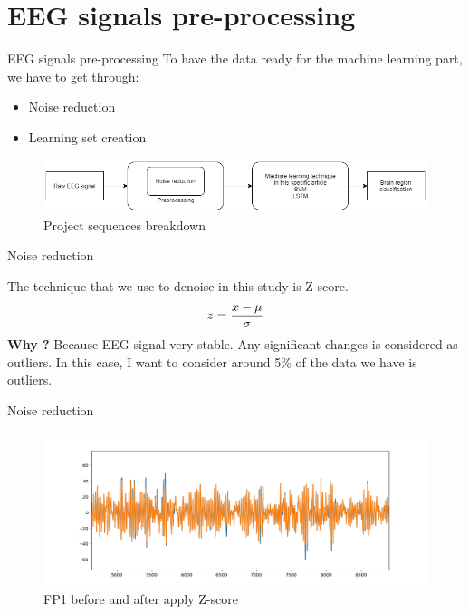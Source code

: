 \documentclass[xcolor=dvipsnames]{beamer} %
\begin{document}
	\section{EEG signals pre-processing}
	
	\begin{frame}{EEG signals pre-processing}
		To have the data ready for the machine learning part, we have to get through:
		\begin{itemize}
		    \item Noise reduction
		    \item Learning set creation
		\end{itemize}
		
		\begin{figure}
	        \centering
	        \includegraphics[scale = 0.4]{images/GeneralDiagram.png}
	        \caption{Project sequences breakdown}
	        \label{fig:breakdown}
	    \end{figure}
	\end{frame}
	
	
	\begin{frame}{Noise reduction}
	
	The technique that we use to denoise in this study is Z-score.
		$$z={{x-\mu}  \over \sigma }$$
	\pause	
	\textbf{Why ?}
	\pause
	Because EEG signal very stable. Any significant changes is considered as outliers. In this case, I want to consider around 5\% of the data we have is outliers.
	\end{frame}
	
	\begin{frame}{Noise reduction}
	    \begin{figure}
	        \centering
	        \includegraphics[scale=0.4]{images/fp1-2.png}
	        \caption{FP1 before and after apply Z-score}
	        \label{fig:FP1}
	    \end{figure}
	\end{frame}
	
\end{document}
